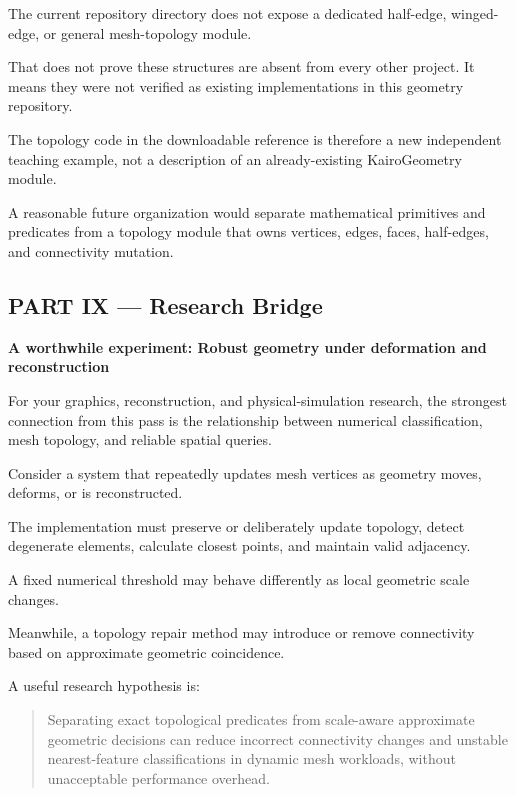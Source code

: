 The current  repository directory does not expose a dedicated half-edge, winged-edge, or general mesh-topology module.

That does not prove these structures are absent from every other project. It means they were not verified as existing implementations in this geometry repository.

The topology code in the downloadable reference is therefore a new independent teaching example, not a description of an already-existing KairoGeometry module.

A reasonable future organization would separate  mathematical primitives and predicates from a topology module that owns vertices, edges, faces, half-edges, and connectivity mutation.

\subsection{PART IX --- Research Bridge}\label{04-visual-computing-ii-ch023-part-ix-research-bridge}

\hypertarget{04-visual-computing-ii-ch023-part-ix-research-bridge}{}

\textbf{A worthwhile experiment: Robust geometry under deformation and reconstruction}

For your graphics, reconstruction, and physical-simulation research, the strongest connection from this pass is the relationship between numerical classification, mesh topology, and reliable spatial queries.

Consider a system that repeatedly updates mesh vertices as geometry moves, deforms, or is reconstructed.

The implementation must preserve or deliberately update topology, detect degenerate elements, calculate closest points, and maintain valid adjacency.

A fixed numerical threshold may behave differently as local geometric scale changes.

Meanwhile, a topology repair method may introduce or remove connectivity based on approximate geometric coincidence.

A useful research hypothesis is:

\begin{quote}
Separating exact topological predicates from scale-aware approximate geometric decisions can reduce incorrect connectivity changes and unstable nearest-feature classifications in dynamic mesh workloads, without unacceptable performance overhead.
\end{quote}

